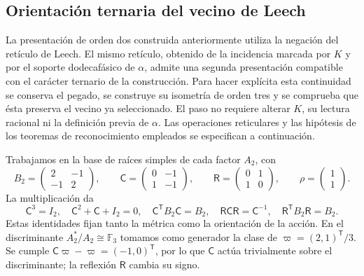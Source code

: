 \subsection{Orientación ternaria del vecino de Leech}
\label{km:orden-tres-reticular}

La presentación de orden dos construida anteriormente utiliza la negación
del retículo de Leech. El mismo retículo, obtenido de la incidencia marcada
por \(K\) y por el soporte dodecafásico de \(\alpha\), admite una segunda
presentación compatible con el carácter ternario de la construcción.
Para hacer explícita esta continuidad se conserva el pegado, se construye
su isometría de orden tres y se comprueba que ésta preserva el vecino ya
seleccionado. El paso no requiere alterar \(K\), su lectura racional ni
la definición previa de \(\alpha\). Las operaciones reticulares y las
hipótesis de los teoremas de reconocimiento empleados se especifican a
continuación.

Trabajamos en la base de raíces simples de cada factor \(A_2\), con
\begin{equation}
 B_2=\begin{pmatrix}2&-1\\-1&2\end{pmatrix},\qquad
 \mathsf C=\begin{pmatrix}0&-1\\1&-1\end{pmatrix},\qquad
 \mathsf R=\begin{pmatrix}0&1\\1&0\end{pmatrix},\qquad
 \rho=\begin{pmatrix}1\\1\end{pmatrix}.
 \label{km:coxeter-reflexion}
\end{equation}
La multiplicación da
\[
 \mathsf C^3=I_2,\quad
 \mathsf C^2+\mathsf C+I_2=0,\quad
 \mathsf C^{\mathsf T}B_2\mathsf C=B_2,\quad
 \mathsf R\mathsf C\mathsf R=\mathsf C^{-1},\quad
 \mathsf R^{\mathsf T}B_2\mathsf R=B_2.
\]
Estas identidades fijan tanto la métrica como la orientación de la acción.
En el discriminante \(A_2^*/A_2\cong\mathbb F_3\) tomamos como
generador la clase de \(\varpi=(2,1)^{\mathsf T}/3\). Se cumple
\(\mathsf C\varpi-\varpi=(-1,0)^{\mathsf T}\), por lo que
\(\mathsf C\) actúa trivialmente sobre el discriminante; la reflexión
\(\mathsf R\) cambia su signo.

